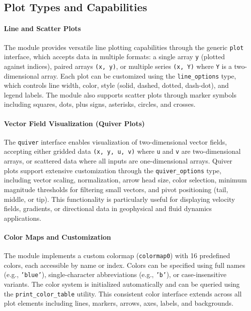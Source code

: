 \documentclass[12pt,a4paper]{report}
\begin{document}
\subsection{Plot Types and Capabilities}

\paragraph{Line and Scatter Plots}
The module provides versatile line plotting capabilities through the generic \texttt{plot} interface, which accepts data in multiple formats: a single array \texttt{y} (plotted against indices), paired arrays \texttt{(x, y)}, or multiple series \texttt{(x, Y)} where \texttt{Y} is a two-dimensional array. Each plot can be customized using the \texttt{line\_options} type, which controls line width, color, style (solid, dashed, dotted, dash-dot), and legend labels. The module also supports scatter plots through marker symbols including squares, dots, plus signs, asterisks, circles, and crosses.

\paragraph{Vector Field Visualization (Quiver Plots)}
The \texttt{quiver} interface enables visualization of two-dimensional vector fields, accepting either gridded data \texttt{(x, y, u, v)} where \texttt{u} and \texttt{v} are two-dimensional arrays, or scattered data where all inputs are one-dimensional arrays. Quiver plots support extensive customization through the \texttt{quiver\_options} type, including vector scaling, normalization, arrow head size, color selection, minimum magnitude thresholds for filtering small vectors, and pivot positioning (tail, middle, or tip). This functionality is particularly useful for displaying velocity fields, gradients, or directional data in geophysical and fluid dynamics applications.

\paragraph{Color Maps and Customization}
The module implements a custom colormap (\texttt{colormap0}) with 16 predefined colors, each accessible by name or index. Colors can be specified using full names (e.g., \texttt{'blue'}), single-character abbreviations (e.g., \texttt{'b'}), or case-insensitive variants. The color system is initialized automatically and can be queried using the \texttt{print\_color\_table} utility. This consistent color interface extends across all plot elements including lines, markers, arrows, axes, labels, and backgrounds.
\end{document}
